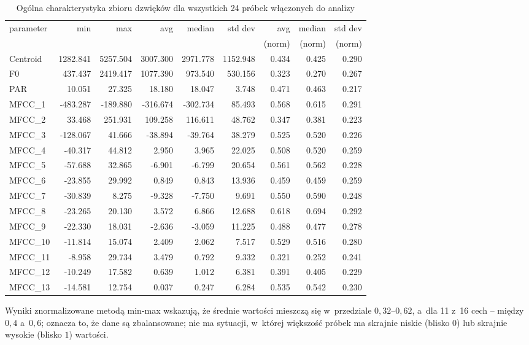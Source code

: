 \documentclass{article}
\begin{document}
\begin{table}[h]
\centering
\begin{tabular}{lrrrrrrrr}
\toprule
 parameter & min & max & avg & median & std dev & avg & median & std dev\\
          & &  &   &  &  &(norm) &(norm) &(norm) \\
\midrule
Centroid & 1282.841 & 5257.504 & 3007.300 & 2971.778 & 1152.948 & 0.434 & 0.425 & 0.290 \\
F0 & 437.437 & 2419.417 & 1077.390 & 973.540 & 530.156 & 0.323 & 0.270 & 0.267 \\
PAR & 10.051 & 27.325 & 18.180 & 18.047 & 3.748 & 0.471 & 0.463 & 0.217 \\
MFCC\_1 & -483.287 & -189.880 & -316.674 & -302.734 & 85.493 & 0.568 & 0.615 & 0.291 \\
MFCC\_2 & 33.468 & 251.931 & 109.258 & 116.611 & 48.762 & 0.347 & 0.381 & 0.223 \\
MFCC\_3 & -128.067 & 41.666 & -38.894 & -39.764 & 38.279 & 0.525 & 0.520 & 0.226 \\
MFCC\_4 & -40.317 & 44.812 & 2.950 & 3.965 & 22.025 & 0.508 & 0.520 & 0.259 \\
MFCC\_5 & -57.688 & 32.865 & -6.901 & -6.799 & 20.654 & 0.561 & 0.562 & 0.228 \\
MFCC\_6 & -23.855 & 29.992 & 0.849 & 0.843 & 13.936 & 0.459 & 0.459 & 0.259 \\
MFCC\_7 & -30.839 & 8.275 & -9.328 & -7.750 & 9.691 & 0.550 & 0.590 & 0.248 \\
MFCC\_8 & -23.265 & 20.130 & 3.572 & 6.866 & 12.688 & 0.618 & 0.694 & 0.292 \\
MFCC\_9 & -22.330 & 18.031 & -2.636 & -3.059 & 11.225 & 0.488 & 0.477 & 0.278 \\
MFCC\_10 & -11.814 & 15.074 & 2.409 & 2.062 & 7.517 & 0.529 & 0.516 & 0.280 \\
MFCC\_11 & -8.958 & 29.734 & 3.479 & 0.792 & 9.332 & 0.321 & 0.252 & 0.241 \\
MFCC\_12 & -10.249 & 17.582 & 0.639 & 1.012 & 6.381 & 0.391 & 0.405 & 0.229 \\
MFCC\_13 & -14.581 & 12.754 & 0.037 & 0.247 & 6.284 & 0.535 & 0.542 & 0.230 \\

\bottomrule
\end{tabular}
\caption{Ogólna charakterystyka zbioru dzwięków dla wszystkich 24 próbek włączonych do analizy}
\end{table}


Wyniki znormalizowane metodą min-max wskazują, że średnie wartości mieszczą się 
w~przedziale $0{,}32$--$0{,}62$, a~dla 11 z~16 cech -- między $0{,}4$ a~$0{,}6$; oznacza to, że dane są zbalansowane; nie ma sytuacji, 
w~której większość próbek ma skrajnie niskie (blisko $0$) lub skrajnie wysokie 
(blisko $1$) wartości.
\end{document}
